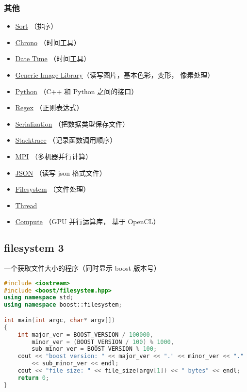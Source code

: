 \subsubsection{其他}
\begin{itemize}
\item \href{https://www.boost.org/doc/libs/1_81_0/libs/sort/doc/html/index.html}{Sort} （排序）
\item \href{https://www.boost.org/doc/libs/1_81_0/doc/html/chrono.html}{Chrono} （时间工具）
\item \href{https://www.boost.org/doc/libs/1_81_0/doc/html/date_time.html}{Date Time} （时间工具）
\item \href{https://www.boost.org/doc/libs/1_81_0/libs/gil/doc/html/index.html}{Generic Image Library}（读写图片，基本色彩，变形， 像素处理）
\item \href{https://www.boost.org/doc/libs/1_81_0/libs/python/doc/html/index.html}{Python} （C++ 和 Python 之间的接口）
\item \href{https://www.boost.org/doc/libs/1_81_0/libs/regex/doc/html/index.html}{Regex} （正则表达式）
\item \href{https://www.boost.org/doc/libs/1_81_0/libs/serialization/doc/index.html}{Serialization} （把数据类型保存文件）
\item \href{https://www.boost.org/doc/libs/master/doc/html/stacktrace.html}{Stacktrace} （记录函数调用顺序）
\item \href{https://www.boost.org/doc/libs/1_81_0/doc/html/mpi.html}{MPI} （多机器并行计算）
\item \href{https://www.boost.org/doc/libs/1_81_0/libs/json/doc/html/index.html}{JSON} （读写 json 格式文件）
\item \href{https://www.boost.org/doc/libs/1_81_0/libs/filesystem/doc/index.htm}{Filesystem} （文件处理）
\item \href{https://www.boost.org/doc/libs/1_81_0/doc/html/thread.html}{Thread}
\item \href{https://www.boost.org/doc/libs/1_81_0/libs/compute/doc/html/index.html}{Compute} （GPU 并行运算库， 基于 OpenCL）
\end{itemize}


\subsection{filesystem 3}
一个获取文件大小的程序（同时显示 boost 版本号）
\begin{lstlisting}[language=cpp, caption=test\_filesystem3.cpp]
#include <iostream>
#include <boost/filesystem.hpp>
using namespace std;
using namespace boost::filesystem;

int main(int argc, char* argv[])
{
	int major_ver = BOOST_VERSION / 100000,
        minor_ver = (BOOST_VERSION / 100) % 1000,
		sub_minor_ver = BOOST_VERSION % 100;
	cout << "boost version: " << major_ver << "." << minor_ver << "."
        << sub_minor_ver << endl;
	cout << "file size: " << file_size(argv[1]) << " bytes" << endl;
	return 0;
}
\end{lstlisting}

